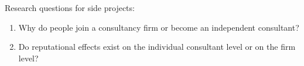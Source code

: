 \documentclass[12pt]{article}
\providecommand{\tightlist}{%
  \setlength{\itemsep}{0pt}\setlength{\parskip}{0pt}}
\begin{document}
Research questions for side projects:

\begin{enumerate}
\def\labelenumi{\arabic{enumi}.}
\tightlist
\item
  Why do people join a consultancy firm or become an independent
  consultant?
\item
  Do reputational effects exist on the individual consultant level or on
  the firm level?
\end{enumerate}



\end{document}
